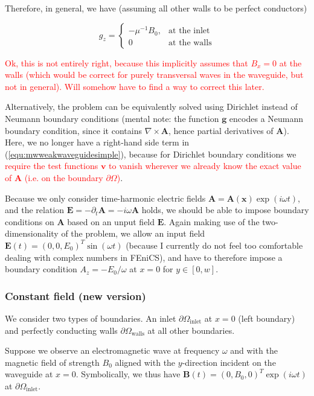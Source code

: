 \documentclass[11pt, a4paper]{article}
\begin{document}
Therefore, in general, we have (assuming all other walls to be perfect conductors) 

\begin{equation}
    g_z = \begin{cases} -\mu^{-1} B_0, & \text{at the inlet} \\ 0 & \text{at the walls} \end{cases}
\end{equation}

\textcolor{red}{Ok, this is not entirely right, because this implicitly assumes that 
$B_x = 0$ at the walls (which would be correct for purely transversal waves in the
waveguide, but not in general). Will somehow have to find a way to  correct this later.}

Alternatively, the problem can be equivalently solved using Dirichlet instead of 
Neumann boundary conditions (mental note: the function $\mathbf{g}$ encodes a Neumann 
boundary condition, since it contains $\nabla \times \mathbf{A}$, hence partial
derivatives of $\mathbf{A}$). Here, we no longer have a right-hand side term in 
(\ref{equ:mwweakwaveguidesimple}), because for Dirichlet boundary conditions we 
\textcolor{red}{require the test functions $\mathbf{v}$ to vanish wherever we already 
know the exact value of $\mathbf{A}$ (i.e. on the boundary $\partial \Omega$)}.

Because we only consider time-harmonic electric fields
$\mathbf{A} = \mathbf{A}(\mathbf{x}) \exp(i \omega t)$, and the relation 
$\mathbf{E} = -\partial_t \mathbf{A} = - i \omega \mathbf{A}$ holds, we should
be able to impose boundary conditions on $\mathbf{A}$ based on an unput field
$\mathbf{E}$. Again making use of the two-dimensionality of the problem, we allow 
an input field $\mathbf{E}(t) = (0, 0, E_0)^T \sin(\omega t)$ (because I currently 
do not feel too comfortable dealing with complex numbers in FEniCS), and have to 
therefore impose a boundary condition $A_z = - E_0 / \omega$ at $x=0$ for $y \in [0, w]$.

\subsubsection{Constant field (new version)}
\label{subsubsec:constfield}

We consider two types of boundaries. An inlet $\partial \Omega_{\text{inlet}}$ at $x=0$
(left boundary) and perfectly conducting walls $\partial \Omega_{\text{walls}}$
at all other boundaries.

Suppose we observe an electromagnetic wave at frequency $\omega$ and with the magnetic 
field of strength $B_0$ aligned with the $y$-direction incident on the waveguide
at $x=0$. Symbolically, we thus have $\mathbf{B}(t) = (0, B_0, 0)^T \exp(i \omega t)$
at $\partial \Omega_{\text{inlet}}$.
\end{document}
